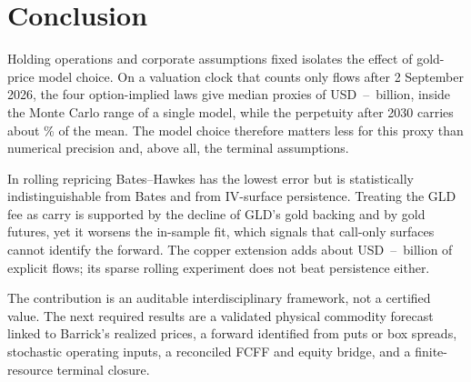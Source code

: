 \section*{Conclusion}

Holding operations and corporate assumptions fixed isolates the effect of gold-price model choice. On a valuation clock that counts only flows after 2 September 2026, the four option-implied laws give median proxies of USD~\ValMedianLow--\ValMedianHigh~billion, inside the Monte Carlo range of a single model, while the perpetuity after 2030 carries about \TerminalShare\% of the mean. The model choice therefore matters less for this proxy than numerical precision and, above all, the terminal assumptions.

In rolling repricing Bates--Hawkes has the lowest error but is statistically indistinguishable from Bates and from IV-surface persistence. Treating the GLD fee as carry is supported by the decline of GLD's gold backing and by gold futures, yet it worsens the in-sample fit, which signals that call-only surfaces cannot identify the forward. The copper extension adds about USD~\CuDeltaLow--\CuDeltaHigh~billion of explicit flows; its sparse rolling experiment does not beat persistence either.

The contribution is an auditable interdisciplinary framework, not a certified value. The next required results are a validated physical commodity forecast linked to Barrick's realized prices, a forward identified from puts or box spreads, stochastic operating inputs, a reconciled FCFF and equity bridge, and a finite-resource terminal closure.
